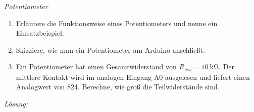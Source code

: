 \documentclass[ngerman, 11pt]{scrreprt}
\begin{document}
	\newpage
	\begin{aufgabe} \emph{Potentiometer}
		
		\begin{enumerate}[label=\alph*), itemsep=0mm]
			\item Erläutere die Funktionsweise eines Potentiometers und nenne ein Einsatzbeispiel.
			\item Skizziere, wie man ein Potentiometer am Arduino anschließt.
			\item Ein Potentiometer hat einen Gesamtwiderstand von $R_{ges}=\SI{10}{\kilo\ohm}$. Der mittlere Kontakt wird im analogen Eingang A0 ausgelesen und liefert einen Analogwert von 824. Berechne, wie groß die Teilwiderstände sind. 
		\end{enumerate}
	\end{aufgabe}
	\vspace{-0.5\baselineskip}
	\emph{Lösung:}
	\vspace{-0.5\baselineskip}
\end{document}
